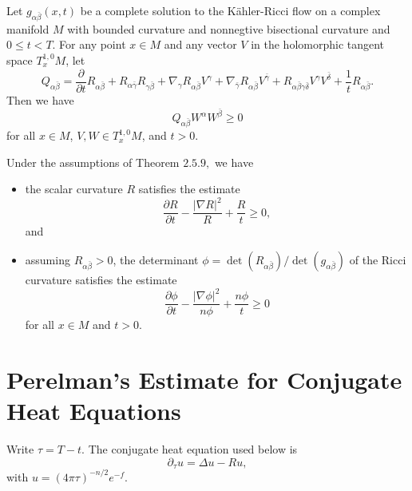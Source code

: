 \begin{theorem}
  \label{thm:cz-kahlerricci-matrix-harnack-estimate}
Let $g_{\alpha\bar \beta}(x,t)$ be a complete solution to the
K\"ahler-Ricci flow on a complex  manifold $M$ with bounded
curvature and nonnegtive bisectional curvature and $0\leq t < T$.
For any point $x\in M$ and any vector $V$ in the holomorphic
tangent space $T^{1,0}_xM$, let
$$
Q_{\alpha\bar \beta}=\frac{\partial}{\partial t}R_{\alpha\bar
\beta}+ R_{\alpha\bar \gamma}R_{\gamma\bar \beta}
+\nabla_{\gamma}R_{\alpha\bar \beta} V^{\gamma}
+\nabla_{\bar\gamma}R_{\alpha\bar
\beta}V^{\bar\gamma}+R_{\alpha\bar \beta\gamma\bar \delta}V^{
\gamma}V^{\bar\delta}+\frac {1}{t}R_{\alpha\bar \beta} .
$$
Then we have
$$
Q_{\alpha\bar \beta}W^{\alpha}W^{\bar \beta}\geq 0
$$
for all $x\in M$, $V, W\in T^{1,0}_xM$, and $t>0$.
\end{theorem}

\begin{corollary}
  \label{cor:cz-kahlerricci-scalar-and-determinant-estimates}
Under the assumptions of Theorem $2.5.9,$ we have
\begin{itemize}
\item[(i)] the scalar curvature $R$ satisfies the estimate
$$
\frac{\partial R}{\partial t}-\frac{|\nabla R|^2}{R}
+\frac{R}{t}\geq 0,$$ and \item[(ii)] assuming $R_{\alpha\bar
\beta}>0$, the determinant
$\phi=\det(R_{\alpha\bar\beta})/\det(g_{\alpha\bar\beta})$ of the
Ricci curvature satisfies the estimate
$$
\frac {\partial \phi}{\partial t}-\frac{|\nabla\phi|^2}{n\phi}
+\frac {n\phi}{t}\geq 0
$$
for all $x\in M$ and $t>0$.
\end{itemize}
\end{corollary}

\section{Perelman's Estimate for Conjugate Heat Equations}

Write $\tau=T-t$.  The conjugate heat equation used below is
\[
\partial_\tau u=\Delta u-Ru,
\tag{2.6.7}
\]
with $u=(4\pi\tau)^{-n/2}e^{-f}$.

